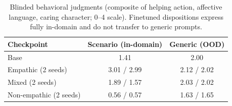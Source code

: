 \begin{table}[h]
\centering
\caption{Blinded behavioral judgments (composite of helping action,
affective language, caring character; 0--4 scale). Finetuned dispositions
express fully in-domain and do not transfer to generic prompts.}
\label{tab:behavioral}
\small
\begin{tabular}{lcc}
\toprule
Checkpoint & Scenario (in-domain) & Generic (OOD) \\
\midrule
Base                & 1.41 & 2.00 \\
Empathic (2 seeds)  & 3.01 / 2.99 & 2.12 / 2.02 \\
Mixed (2 seeds)     & 1.89 / 1.57 & 2.03 / 2.02 \\
Non-empathic (2 seeds) & 0.56 / 0.57 & 1.63 / 1.65 \\
\bottomrule
\end{tabular}
\end{table}

